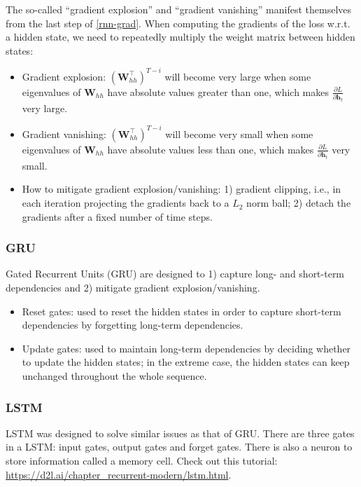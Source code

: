 The so-called ``gradient explosion'' and ``gradient vanishing'' manifest themselves from the last step of \eqref{rnn-grad}.
When computing the gradients of the loss w.r.t. a hidden state, we need to repeatedly multiply the weight matrix between hidden states:  
    \begin{itemize}
        \item Gradient explosion: $\left(\bm{W}_{hh}^\top \right)^{T-i}$ will become 
        very large when some eigenvalues of $\bm{W}_{hh}$ have absolute values greater than one, which makes $\frac{\partial L}{\partial \bm{h}_t}$ very large.
        \item Gradient vanishing: $\left(\bm{W}_{hh}^\top \right)^{T-i}$ will become very small when some eigenvalues of $\bm{W}_{hh}$ have absolute values less than one, which makes $\frac{\partial L}{\partial \bm{h}_t}$ very small.
        \item How to mitigate gradient explosion/vanishing: 1) gradient clipping, i.e., in each iteration projecting the gradients back to a $L_2$ norm ball; 2) detach the gradients after a fixed number of time steps.
    \end{itemize}
    
\subsubsection{GRU}
    Gated Recurrent Units (GRU) are designed to 1) capture long- and short-term dependencies and 2) mitigate gradient explosion/vanishing.
    \begin{itemize}
        \item Reset gates: used to reset the hidden states in order to capture short-term dependencies by forgetting long-term dependencies.
        \item Update gates: used to maintain long-term dependencies by deciding whether to update the hidden states; in the extreme case, the hidden states can keep unchanged throughout the whole sequence.
    \end{itemize}
    
\subsubsection{LSTM}
    LSTM was designed to solve similar issues as that of GRU.
    There are three gates in a LSTM: input gates, output gates and forget gates. 
    There is also a neuron to store information called a memory cell.
    Check out this tutorial: \url{https://d2l.ai/chapter_recurrent-modern/lstm.html}.
    
